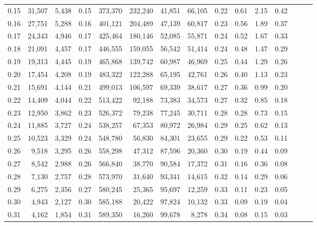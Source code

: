 \begin{tabular}{rrrrrrrrrrrrrrr}
0.15 &  31,507 &  5,438 &  0.15 &  373,370 &  232,240 &   41,851 &   66,105 &  0.22 &  0.61 &  2.15 &      0.42 \\
0.16 &  27,751 &  5,288 &  0.16 &  401,121 &  204,489 &   47,139 &   60,817 &  0.23 &  0.56 &  1.89 &      0.37 \\
0.17 &  24,343 &  4,946 &  0.17 &  425,464 &  180,146 &   52,085 &   55,871 &  0.24 &  0.52 &  1.67 &      0.33 \\
0.18 &  21,091 &  4,457 &  0.17 &  446,555 &  159,055 &   56,542 &   51,414 &  0.24 &  0.48 &  1.47 &      0.29 \\
0.19 &  19,313 &  4,445 &  0.19 &  465,868 &  139,742 &   60,987 &   46,969 &  0.25 &  0.44 &  1.29 &      0.26 \\
0.20 &  17,454 &  4,208 &  0.19 &  483,322 &  122,288 &   65,195 &   42,761 &  0.26 &  0.40 &  1.13 &      0.23 \\
0.21 &  15,691 &  4,144 &  0.21 &  499,013 &  106,597 &   69,339 &   38,617 &  0.27 &  0.36 &  0.99 &      0.20 \\
0.22 &  14,409 &  4,044 &  0.22 &  513,422 &   92,188 &   73,383 &   34,573 &  0.27 &  0.32 &  0.85 &      0.18 \\
0.23 &  12,950 &  3,862 &  0.23 &  526,372 &   79,238 &   77,245 &   30,711 &  0.28 &  0.28 &  0.73 &      0.15 \\
0.24 &  11,885 &  3,727 &  0.24 &  538,257 &   67,353 &   80,972 &   26,984 &  0.29 &  0.25 &  0.62 &      0.13 \\
0.25 &  10,523 &  3,329 &  0.24 &  548,780 &   56,830 &   84,301 &   23,655 &  0.29 &  0.22 &  0.53 &      0.11 \\
0.26 &   9,518 &  3,295 &  0.26 &  558,298 &   47,312 &   87,596 &   20,360 &  0.30 &  0.19 &  0.44 &      0.09 \\
0.27 &   8,542 &  2,988 &  0.26 &  566,840 &   38,770 &   90,584 &   17,372 &  0.31 &  0.16 &  0.36 &      0.08 \\
0.28 &   7,130 &  2,757 &  0.28 &  573,970 &   31,640 &   93,341 &   14,615 &  0.32 &  0.14 &  0.29 &      0.06 \\
0.29 &   6,275 &  2,356 &  0.27 &  580,245 &   25,365 &   95,697 &   12,259 &  0.33 &  0.11 &  0.23 &      0.05 \\
0.30 &   4,943 &  2,127 &  0.30 &  585,188 &   20,422 &   97,824 &   10,132 &  0.33 &  0.09 &  0.19 &      0.04 \\
0.31 &   4,162 &  1,854 &  0.31 &  589,350 &   16,260 &   99,678 &    8,278 &  0.34 &  0.08 &  0.15 &      0.03 \\

\end{tabular}

